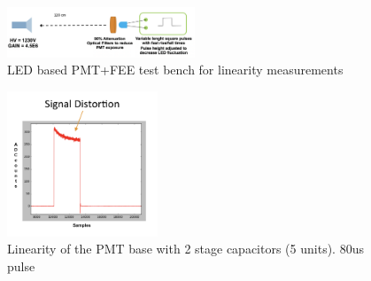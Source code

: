\documentclass[a4paper, 10pt, oneside, twocolumn, 3p]{elsarticle}
\begin{document}
\begin{figure}[H]
	\begin{center}
		\includegraphics[width=0.5\textwidth]{./figures/LED_testbench1.png}
		\caption{LED based PMT+FEE test bench for linearity measurements}
		\label{fig:LED_testbench}
	\end{center}
\end{figure}




\begin{figure}
  \begin{center}
    \includegraphics[width=0.4\textwidth]{./figures/5C_base.png}
    \caption{Linearity of the PMT base with 2 stage capacitors (5 units). 80us pulse}
    \label{fig:5C}
  \end{center}
\end{figure}
\end{document}
